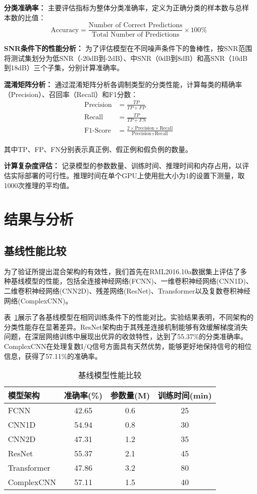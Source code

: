 \documentclass[conference]{IEEEtran}
\begin{document}
\textbf{分类准确率：}
主要评估指标为整体分类准确率，定义为正确分类的样本数与总样本数的比值：
\begin{equation}
\text{Accuracy} = \frac{\text{Number of Correct Predictions}}{\text{Total Number of Predictions}} \times 100\%
\end{equation}

\textbf{SNR条件下的性能分析：}
为了评估模型在不同噪声条件下的鲁棒性，按SNR范围将测试集划分为低SNR（-20dB到-2dB）、中SNR（0dB到8dB）和高SNR（10dB到18dB）三个子集，分别计算准确率。

\textbf{混淆矩阵分析：}
通过混淆矩阵分析各调制类型的分类性能，计算每类的精确率（Precision）、召回率（Recall）和F1分数：
\begin{align}
\text{Precision} &= \frac{TP}{TP + FP} \\
\text{Recall} &= \frac{TP}{TP + FN} \\
\text{F1-Score} &= \frac{2 \times \text{Precision} \times \text{Recall}}{\text{Precision} + \text{Recall}}
\end{align}

其中TP、FP、FN分别表示真正例、假正例和假负例的数量。

\textbf{计算复杂度评估：}
记录模型的参数数量、训练时间、推理时间和内存占用，以评估实际部署的可行性。推理时间在单个GPU上使用批大小为1的设置下测量，取1000次推理的平均值。

\section{结果与分析}

\subsection{基线性能比较}

为了验证所提出混合架构的有效性，我们首先在RML2016.10a数据集上评估了多种基线模型的性能，包括全连接神经网络(FCNN)、一维卷积神经网络(CNN1D)、二维卷积神经网络(CNN2D)、残差网络(ResNet)、Transformer以及复数卷积神经网络(ComplexCNN)。

表~\ref{tab:baseline_comparison}展示了各基线模型在相同训练条件下的性能对比。实验结果表明，不同架构的分类性能存在显著差异。ResNet架构由于其残差连接机制能够有效缓解梯度消失问题，在深层网络训练中展现出优异的收敛特性，达到了55.37\%的分类准确率。ComplexCNN在处理复数I/Q信号方面具有天然优势，能够更好地保持信号的相位信息，获得了57.11\%的准确率。

\begin{table}[h]
\centering
\caption{基线模型性能比较}
\label{tab:baseline_comparison}
\begin{tabular}{@{}lccc@{}}
\toprule
模型架构 & 准确率(\%) & 参数量(M) & 训练时间(min) \\
\midrule
FCNN & 42.65 & 0.6 & 25 \\
CNN1D & 54.94 & 0.8 & 30 \\
CNN2D & 47.31 & 1.2 & 35 \\
ResNet & 55.37 & 2.1 & 45 \\
Transformer & 47.86 & 3.2 & 80 \\
ComplexCNN & 57.11 & 1.5 & 40 \\
\bottomrule
\end{tabular}
\end{table}
\end{document}
